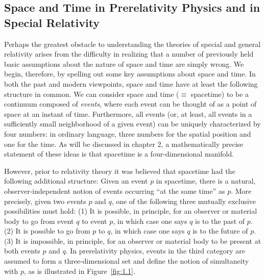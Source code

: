 
\subsection{Space and Time in Prerelativity Physics and in Special Relativity}\label{sec:1.2}

Perhaps the greatest obstacle to understanding the theories of special and general
relativity arises from the difficulty in realizing that a number of previously held basic
assumptions about the nature of space and time are simply wrong. We begin,
therefore, by spelling out some key assumptions about space and time. In both the
past and modern viewpoints, space and time have at least the following structure in
common. We can consider space and time (\(\equiv\) spacetime) to be a continuum
composed of \emph{events}, where each event can be thought of as a point of space at
an instant of time. Furthermore, all events (or, at least, all events in a sufficiently
small neighborhood of a given event) can be uniquely characterized by four numbers:
in ordinary language, three numbers for the spatial position and one for the time. As
will be discussed in chapter 2, a mathematically precise statement of these ideas is
that spacetime is a four-dimensional manifold.

However, prior to relativity theory it was believed that spacetime had the following
additional structure: Given an event \(p\) in spacetime, there is a natural,
observer-independent notion of events occurring ``at the same time'' as \(p\). More
precisely, given two events \(p\) and \(q\), one of the following three mutually
exclusive possibilities must hold: (1) It is possible, in principle, for an observer or
material body to go from event \(q\) to event \(p\), in which case one says \(q\) is to
the past of \(p\). (2) It is possible to go from \(p\) to \(q\), in which case one says
\(q\) is to the future of \(p\). (3) It is impossible, in principle, for an observer or
material body to be present at both events \(p\) and \(q\). In prerelativity physics,
events in the third category are assumed to form a three-dimensional set and define
the notion of simultaneity with \(p\), as is illustrated in Figure~\ref{fig:1.1}.


